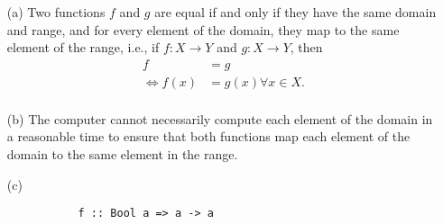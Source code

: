 
\begin{itemize}
    \item[(a)] Two functions $f$ and $g$ are equal if and only if they have
        the same domain and range, and for every element of the domain, they
        map to the same element of the range, i.e., if $f: X \to Y$ and $g: X \to Y$,
        then
        \begin{equation*}
            \begin{split}
                f &= g \\
                \Leftrightarrow f(x) &= g(x) \forall x \in X. \\
            \end{split}
        \end{equation*}
    \item[(b)] The computer cannot necessarily compute each element of the domain
        in a reasonable time to ensure that both functions map each element of the 
        domain to the same element in the range.
    \item[(c)] 
        \begin{verbatim}
           f :: Bool a => a -> a 
        \end{verbatim}
\end{itemize}
